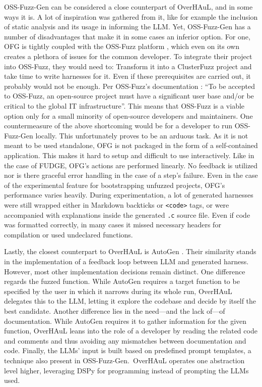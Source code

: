 \documentclass[
  a4paper,
  DIV=11,
  numbers=noendperiod]{scrreprt}
\theoremstyle{definition}
\theoremstyle{remark}
\begin{document}
OSS-Fuzz-Gen \autocite{oss-fuzz-gen} can be considered a close
counterpart of OverHAuL, and in some ways it is. A lot of inspiration
was gathered from it, like for example the inclusion of static analysis
and its usage in informing the LLM. Yet, OSS-Fuzz-Gen has a number of
disadvantages that make it in some cases an inferior option. For one,
OFG is tightly coupled with the OSS-Fuzz platform \autocite{oss-fuzz},
which even on its own creates a plethora of issues for the common
developer. To integrate their project into OSS-Fuzz, they would need to:
Transform it into a ClusterFuzz project \autocite{clusterfuzz} and take
time to write harnesses for it. Even if these prerequisites are carried
out, it probably would not be enough. Per OSS-Fuzz's documentation
\autocite{ossfuzzdocs2025}: ``To be accepted to OSS-Fuzz, an open-source
project must have a significant user base and/or be critical to the
global IT infrastructure''. This means that OSS-Fuzz is a viable option
only for a small minority of open-source developers and maintainers. One
countermeasure of the above shortcoming would be for a developer to run
OSS-Fuzz-Gen locally. This unfortunately proves to be an arduous task.
As it is not meant to be used standalone, OFG is not packaged in the
form of a self-contained application. This makes it hard to setup and
difficult to use interactively. Like in the case of FUDGE, OFG's actions
are performed linearly. No feedback is utilized nor is there graceful
error handling in the case of a step's failure. Even in the case of the
experimental feature for bootstrapping unfuzzed projects, OFG's
performance varies heavily. During experimentation, a lot of generated
harnesses were still wrapped either in Markdown backticks or
\texttt{\textless{}code\textgreater{}} tags, or were accompanied with
explanations inside the generated \texttt{.c} source file. Even if code
was formatted correctly, in many cases it missed necessary headers for
compilation or used undeclared functions.

Lastly, the closest counterpart to OverHAuL is AutoGen
\autocite{sun2024}. Their similarity stands in the implementation of a
feedback loop between LLM and generated harness. However, most other
implementation decisions remain distinct. One difference regards the
fuzzed function. While AutoGen requires a target function to be
specified by the user in which it narrows during its whole run, OverHAuL
delegates this to the LLM, letting it explore the codebase and decide by
itself the best candidate. Another difference lies in the need---and the
lack of---of documentation. While AutoGen requires it to gather
information for the given function, OverHAuL leans into the role of a
developer by reading the related code and comments and thus avoiding any
mismatches between documentation and code. Finally, the LLMs' input is
built based on predefined prompt templates, a technique also present in
OSS-Fuzz-Gen.~OverHAuL operates one abstraction level higher, leveraging
DSPy \autocite{dspy} for programming instead of prompting the LLMs used.
\end{document}
